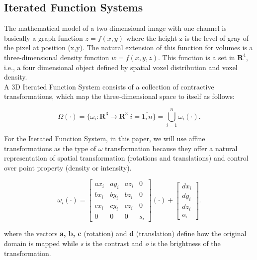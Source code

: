 \documentclass[10pt, conference, compsocconf]{IEEEtran}
\begin{document}
\subsection{Iterated Function Systems}

The mathematical model of a two dimensional image with one channel is basically a graph function $z=f(x,y)$ where the height z is the level of gray of the pixel at position (x,y). The natural extension of this function for volumes is a three-dimensional density function $w=f(x,y,z)$. This function is a set in $\mathbf{R}^4$, i.e., a four dimensional object defined by spatial voxel distribution and voxel density.~\\

A 3D Iterated Function System consists of a collection of contractive transformations, which map the three-dimensional space to itself as follows:

\begin{equation}\label{map}
\Omega(\cdot) = \{\omega_i : \mathbf{R}^3 \to \textbf{R}^3 | i = \overline{1,n}\} = \displaystyle\bigcup_{i=1}^n\omega_i(\cdot).
\end{equation}

For the Iterated Function System, in this paper, we will use affine transformations as the type of $\omega$ transformation because they offer a natural representation of spatial transformation (rotations and translations) and control over point property (density or intensity).

\begin{equation}\label{ifs}
\omega_i\left(\cdot\right)=
\left[\begin{array}{cccc} ax_i & ay_i & az_i & 0\\  bx_i & by_i & bz_i & 0\\ cx_i & cy_i & cz_i & 0\\ 0 & 0 & 0 & s_i\end{array}\right]\left(\cdot\right) + \left[\begin{array}{cccc} dx_i \\ dy_i \\ dz_i \\o_i \end{array}\right].
\end{equation}

\begin{flushleft}
where the vectors \textbf{a, b, c} (rotation) and \textbf{d} (translation) define how the original domain is mapped while \emph{s} is the contrast and \emph{o} is the brightness of the transformation.
\end{flushleft} 
\end{document}

